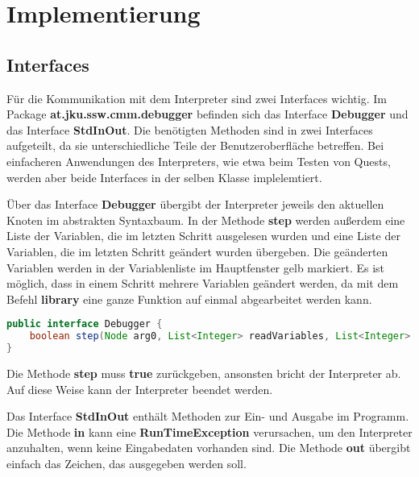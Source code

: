 

\section{Implementierung}


\subsection{Interfaces}
\label{sec:deb-impl-interfaces}
Für die Kommunikation mit dem Interpreter sind zwei Interfaces wichtig. Im Package \textbf{at.jku.ssw.cmm.debugger} befinden sich das Interface \textbf{Debugger} und das Interface \textbf{StdInOut}. Die benötigten Methoden sind in zwei Interfaces aufgeteilt, da sie unterschiedliche Teile der Benutzeroberfläche betreffen. Bei einfacheren Anwendungen des Interpreters, wie etwa beim Testen von Quests, werden aber beide Interfaces in der selben Klasse implelemtiert.

Über das Interface \textbf{Debugger} übergibt der Interpreter jeweils den aktuellen Knoten im abstrakten Syntaxbaum. In der Methode \textbf{step} werden außerdem eine Liste der Variablen, die im letzten Schritt ausgelesen wurden und eine Liste der Variablen, die im letzten Schritt geändert wurden übergeben. Die geänderten Variablen werden in der Variablenliste im Hauptfenster gelb markiert. Es ist möglich, dass in einem Schritt mehrere Variablen geändert werden, da mit dem Befehl \textbf{library} eine ganze Funktion auf einmal abgearbeitet werden kann.

\begin{lstlisting}[language=JAVA]
public interface Debugger {
	boolean step(Node arg0, List<Integer> readVariables, List<Integer> changedVariables);
}
\end{lstlisting}

Die Methode \textbf{step} muss \textbf{true} zurückgeben, ansonsten bricht der Interpreter ab. Auf diese Weise kann der Interpreter beendet werden.

Das Interface \textbf{StdInOut} enthält Methoden zur Ein- und Ausgabe im Programm. Die Methode \textbf{in} kann eine \textbf{RunTimeException} verursachen, um den Interpreter anzuhalten, wenn keine Eingabedaten vorhanden sind. Die Methode \textbf{out} übergibt einfach das Zeichen, das ausgegeben werden soll.

